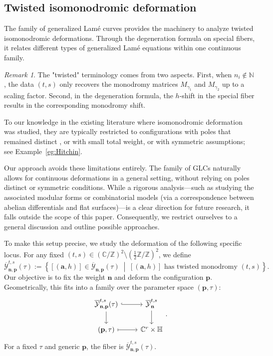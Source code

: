 \documentclass[11pt]{amsart}
\theoremstyle{remark}
\newtheorem{remark}[theorem]{Remark}
\numberwithin{equation}{section}
\begin{document}
\subsection{Twisted isomonodromic deformation}
The family of generalized Lam\'e curves provides the machinery to analyze twisted isomonodromic deformations.  Through the degeneration formula on special fibers, it relates different types of generalized Lam\'e equations within one continuous family.
\begin{remark}
The "twisted" terminology comes from two aspects. First, when $n_i \notin \mathbb{N}$, the data $(t,s)$ only recovers the monodromy matrices $M_{\gamma_1}$ and $M_{\gamma_2}$ up to a scaling factor. Second, in the degeneration formula, the $h$-shift in the special fiber results in the corresponding monodromy shift. 
\end{remark}

To our knowledge in the existing literature where isomonodromic deformation was studied, they are typically restricted to configurations with poles that remained distinct \cite{Kawai_2003}, or with small total weight, or with symmetric assumptions; see Example~\ref{eg:Hitchin}.

Our approach avoids these limitations entirely. The family of GLCs naturally allows for continuous deformations in a general setting, without relying on poles distinct or symmetric conditions. While a rigorous analysis—such as studying the associated modular forms or combinatorial models (via a correspondence between abelian differentials and flat surfaces)—is a clear direction for future research, it falls outside the scope of this paper. Consequently, we restrict ourselves to a general discussion and outline possible approaches.

To make this setup precise, we study the deformation of the following specific locus. For any fixed $(t,s) \in (\mathbb{C}/\mathbb{Z})^2 \setminus (\tfrac{1}{2} \mathbb{Z} / \mathbb{Z})^2$, we define
\[
\overline{\mathcal{Y}}^{t,s}_{\mathbf{n}, \mathbf{p}}(\tau) := 
\left\{
    [(\mathbf{a},h)] \in \overline{\mathcal{Y}}_{\mathbf{n},\mathbf{p}}(\tau)
    \;\middle|\;
    [(\mathbf{a},h)] \text{ has twisted monodromy } (t,s)
\right\}.
\]
Our objective is to fix the weight $\mathbf{n}$ and deform the configuration $\mathbf{p}$. Geometrically, this fits into a family over the parameter space $(\mathbf{p},\tau)$:
\[
\begin{tikzcd}
\overline{\mathcal{Y}}^{t,s}_{\mathbf{n},\mathbf{p}}(\tau) \arrow[r, hook] \arrow[d] & \overline{\mathcal{Y}}^{t,s}_{\mathbf{n}} \arrow[d] \\
(\mathbf{p}, \tau) \arrow[r, mapsto]                                                 & \mathbb{C}^r \times \mathbb{H}
\end{tikzcd}.
\]
For a fixed $\tau$ and generic $\mathbf{p}$, the fiber is $\overline{\mathcal{Y}}_{\mathbf{n},\mathbf{p}}^{t,s}(\tau)$. 
\end{document}

